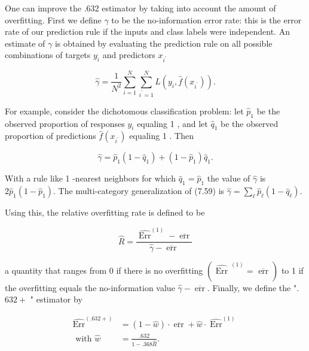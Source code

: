 \documentclass[10pt]{article}
\begin{document}
One can improve the .632 estimator by taking into account the amount of overfitting. First we define $\gamma$ to be the no-information error rate: this is the error rate of our prediction rule if the inputs and class labels were independent. An estimate of $\gamma$ is obtained by evaluating the prediction rule on all possible combinations of targets $y_{i}$ and predictors $x_{i^{\prime}}$


\begin{equation*}
\hat{\gamma}=\frac{1}{N^{2}} \sum_{i=1}^{N} \sum_{i^{\prime}=1}^{N} L\left(y_{i}, \hat{f}\left(x_{i^{\prime}}\right)\right) . \tag{7.58}
\end{equation*}


For example, consider the dichotomous classification problem: let $\hat{p}_{1}$ be the observed proportion of responses $y_{i}$ equaling 1 , and let $\hat{q}_{1}$ be the observed proportion of predictions $\hat{f}\left(x_{i^{\prime}}\right)$ equaling 1 . Then


\begin{equation*}
\hat{\gamma}=\hat{p}_{1}\left(1-\hat{q}_{1}\right)+\left(1-\hat{p}_{1}\right) \hat{q}_{1} . \tag{7.59}
\end{equation*}


With a rule like 1 -nearest neighbors for which $\hat{q}_{1}=\hat{p}_{1}$ the value of $\hat{\gamma}$ is $2 \hat{p}_{1}\left(1-\hat{p}_{1}\right)$. The multi-category generalization of (7.59) is $\hat{\gamma}=\sum_{\ell} \hat{p}_{\ell}\left(1-\hat{q}_{\ell}\right)$.

Using this, the relative overfitting rate is defined to be


\begin{equation*}
\hat{R}=\frac{\widehat{\operatorname{Err}}^{(1)}-\overline{\operatorname{err}}}{\hat{\gamma}-\overline{\operatorname{err}}} \tag{7.60}
\end{equation*}


a quantity that ranges from 0 if there is no overfitting $\left(\widehat{\text { Err }}^{(1)}=\overline{\text { err }}\right)$ to 1 if the overfitting equals the no-information value $\hat{\gamma}-\overline{\operatorname{err}}$. Finally, we define the ". $632+$ " estimator by


\begin{align*}
\widehat{\operatorname{Err}}^{(.632+)} & =(1-\hat{w}) \cdot \overline{\operatorname{err}}+\hat{w} \cdot \widehat{\operatorname{Err}}^{(1)}  \tag{7.61}\\
\text { with } \hat{w} & =\frac{.632}{1-.368 \hat{R}} .
\end{align*}
\end{document}
